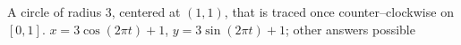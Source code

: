 {A circle of radius 3, centered at $(1,1)$, that is traced once counter--clockwise on $[0,1]$.
}
{$x=3\cos (2\pi t)+1$, $y=3\sin (2\pi t)+1$; other answers possible
}
